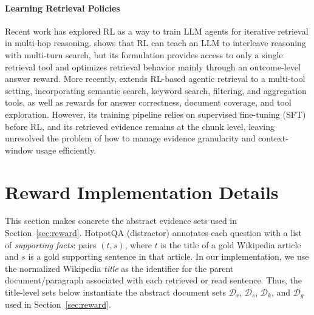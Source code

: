 \documentclass[11pt]{article}
\begin{document}

\paragraph{Learning Retrieval Policies}

Recent work has explored RL as a way to train LLM agents for iterative retrieval in multi-hop reasoning. \citet{jin2025search} shows that RL can teach an LLM to interleave reasoning with multi-turn search, but its formulation provides access to only a single retrieval tool and optimizes retrieval behavior mainly through an outcome-level answer reward. More recently, \citet{luo2025marag} extends RL-based agentic retrieval to a multi-tool setting, incorporating semantic search, keyword search, filtering, and aggregation tools, as well as rewards for answer correctness, document coverage, and tool exploration. However, its training pipeline relies on supervised fine-tuning (SFT) before RL, and its retrieved evidence remains at the chunk level, leaving unresolved the problem of how to manage evidence granularity and context-window usage efficiently.


\section{Reward Implementation Details}
\label{app:reward-impl}
This section makes concrete the abstract evidence sets used in Section~\ref{sec:reward}. HotpotQA (distractor) annotates each question with a list of \emph{supporting facts}: pairs $(t,s)$, where $t$ is the title of a gold Wikipedia article and $s$ is a gold supporting sentence in that article. In our implementation, we use the normalized Wikipedia \emph{title} as the identifier for the parent document/paragraph associated with each retrieved or read sentence. Thus, the title-level sets below instantiate the abstract document sets $\mathcal{D}_r$, $\mathcal{D}_s$, $\mathcal{D}_k$, and $\mathcal{D}_g$ used in Section~\ref{sec:reward}.
\end{document}
